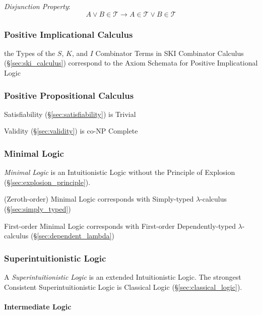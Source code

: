 \emph{Disjunction Property}:
\[
  A \vee B \in \mathcal{T}
  \rightarrow A \in \mathcal{T} \vee B \in \mathcal{T}
\]



\subsubsection{Positive Implicational Calculus}
\label{sec:positive_implicational}

the Types of the $S$, $K$, and $I$ Combinator Terms in SKI Combinator
Calculus (\S\ref{sec:ski_calculus}) correspond to the Axiom Schemata
for Positive Implicational Logic



\subsubsection{Positive Propositional Calculus}
\label{sec:positive_propositional}

Satisfiability (\S\ref{sec:satisfiability}) is Trivial

Validity (\S\ref{sec:validity}) is co-NP Complete %



\subsubsection{Minimal Logic}\label{sec:minimal_logic}

\emph{Minimal Logic} is an Intuitionistic Logic without the Principle
of Explosion (\S\ref{sec:explosion_principle}).

(Zeroth-order) Minimal Logic corresponds with Simply-typed
$\lambda$-calculus (\S\ref{sec:simply_typed})

First-order Minimal Logic corresponds with First-order Dependently-typed
$\lambda$-calculus (\S\ref{sec:dependent_lambda})



\subsubsection{Superintuitionistic Logic}
\label{sec:superintuitionistic_logic}

A \emph{Superintuitionistic Logic} is an extended Intuitionistic
Logic. The strongest Consistent Superintuitionistic Logic is Classical
Logic (\S\ref{sec:classical_logic}).



\paragraph{Intermediate Logic}\label{sec:intermediate_logic}\hfill

